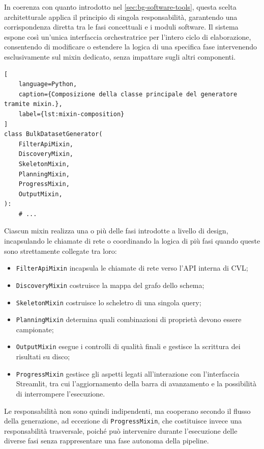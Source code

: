 \documentclass[12pt,a4paper,openright,twoside]{book}
\begin{document}
In coerenza con quanto introdotto nel \cref{sec:bg-software-tools}, questa
scelta architetturale applica il principio di singola responsabilità, garantendo
una corrispondenza diretta tra le fasi concettuali e i moduli software. Il
sistema espone così un'unica interfaccia orchestratrice per l'intero ciclo di
elaborazione, consentendo di modificare o estendere la logica di una specifica
fase intervenendo esclusivamente sul mixin dedicato, senza impattare sugli altri
componenti.

\begin{lstlisting}[
    language=Python,
    caption={Composizione della classe principale del generatore tramite mixin.},
    label={lst:mixin-composition}
]
class BulkDatasetGenerator(
    FilterApiMixin,
    DiscoveryMixin,
    SkeletonMixin,
    PlanningMixin,
    ProgressMixin,
    OutputMixin,
):
    # ...
\end{lstlisting}

Ciascun mixin realizza una o più delle fasi introdotte a livello di design,
incapsulando le chiamate di rete o coordinando la logica di più fasi quando
queste sono strettamente collegate tra loro:

\begin{itemize}
    \item \texttt{FilterApiMixin} incapsula le chiamate di rete verso l'API
          interna di CVL;

    \item \texttt{DiscoveryMixin} costruisce la mappa del grafo dello schema;

    \item \texttt{SkeletonMixin} costruisce lo scheletro di una singola query;

    \item \texttt{PlanningMixin} determina quali combinazioni di proprietà
          devono essere campionate;

    \item \texttt{OutputMixin} esegue i controlli di qualità finali e gestisce
          la scrittura dei risultati su disco;

    \item \texttt{ProgressMixin} gestisce gli aspetti legati all'interazione con
          l'interfaccia Streamlit, tra cui l'aggiornamento della barra di
          avanzamento e la possibilità di interrompere l'esecuzione.
\end{itemize}

Le responsabilità non sono quindi indipendenti, ma cooperano secondo il flusso
della generazione, ad eccezione di \texttt{ProgressMixin}, che costituisce
invece una responsabilità trasversale, poiché può intervenire durante
l'esecuzione delle diverse fasi senza rappresentare una fase autonoma della
pipeline.
\end{document}
